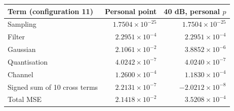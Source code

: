 \begin{tabular}{lrr}
\toprule
Term (configuration 11) & Personal point & 40 dB, personal $p$ \\
\midrule
Sampling & $1.7504\times10^{-25}$ & $1.7504\times10^{-25}$ \\
Filter & $2.2951\times10^{-4}$ & $2.2951\times10^{-4}$ \\
Gaussian & $2.1061\times10^{-2}$ & $3.8852\times10^{-6}$ \\
Quantisation & $4.0242\times10^{-7}$ & $4.0240\times10^{-7}$ \\
Channel & $1.2600\times10^{-4}$ & $1.1830\times10^{-4}$ \\
Signed sum of 10 cross terms & $2.2131\times10^{-7}$ & $-2.0212\times10^{-8}$ \\
Total MSE & $2.1418\times10^{-2}$ & $3.5208\times10^{-4}$ \\
\bottomrule
\end{tabular}
